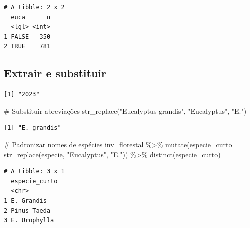 \documentclass[
  letterpaper,
]{scrbook}
\newenvironment{Shaded}{\begin{snugshade}}{\end{snugshade}}
\newcommand{\AttributeTok}[1]{\textcolor[rgb]{0.40,0.45,0.13}{#1}}
\newcommand{\CommentTok}[1]{\textcolor[rgb]{0.37,0.37,0.37}{#1}}
\newcommand{\FunctionTok}[1]{\textcolor[rgb]{0.28,0.35,0.67}{#1}}
\newcommand{\NormalTok}[1]{\textcolor[rgb]{0.00,0.23,0.31}{#1}}
\newcommand{\SpecialCharTok}[1]{\textcolor[rgb]{0.37,0.37,0.37}{#1}}
\newcommand{\StringTok}[1]{\textcolor[rgb]{0.13,0.47,0.30}{#1}}
\begin{document}
\begin{verbatim}
# A tibble: 2 x 2
  euca      n
  <lgl> <int>
1 FALSE   350
2 TRUE    781
\end{verbatim}

\subsection{Extrair e substituir}\label{extrair-e-substituir}

\begin{Shaded}
\end{Shaded}

\begin{verbatim}
[1] "2023"
\end{verbatim}

\begin{Shaded}
\begin{Highlighting}[]
\CommentTok{\# Substituir abreviações}
\FunctionTok{str\_replace}\NormalTok{(}\StringTok{"Eucalyptus grandis"}\NormalTok{, }\StringTok{"Eucalyptus"}\NormalTok{, }\StringTok{"E."}\NormalTok{)}
\end{Highlighting}
\end{Shaded}

\begin{verbatim}
[1] "E. grandis"
\end{verbatim}

\begin{Shaded}
\begin{Highlighting}[]
\CommentTok{\# Padronizar nomes de espécies}
\NormalTok{inv\_florestal }\SpecialCharTok{\%\textgreater{}\%}
  \FunctionTok{mutate}\NormalTok{(}\AttributeTok{especie\_curto =} \FunctionTok{str\_replace}\NormalTok{(especie, }\StringTok{"Eucalyptus"}\NormalTok{, }\StringTok{"E."}\NormalTok{)) }\SpecialCharTok{\%\textgreater{}\%}
  \FunctionTok{distinct}\NormalTok{(especie\_curto)}
\end{Highlighting}
\end{Shaded}

\begin{verbatim}
# A tibble: 3 x 1
  especie_curto
  <chr>        
1 E. Grandis   
2 Pinus Taeda  
3 E. Urophylla 
\end{verbatim}
\end{document}

